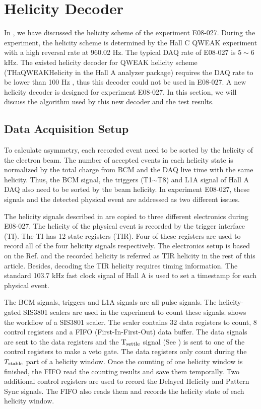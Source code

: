 
\chapter{Helicity Decoder}
\label{A2}

In , we have discussed the helicity scheme of the experiment E08-027. During the experiment, the helicity scheme is determined by the Hall C QWEAK experiment with a high reversal rate at 960.02 Hz. The typical DAQ rate of E08-027 is $5\sim6$ kHz. The existed helicity decoder for QWEAK helicity scheme (THaQWEAKHelicity in the Hall A analyzer package) requires the DAQ rate to be lower than 100 Hz \cite{Hansen2015}, thus this decoder could not be used in E08-027. A new helicity decoder is designed for experiment E08-027. In this section, we will discuss the algorithm used by this new decoder and the test results.

\section{Data Acquisition Setup}
\label{A2S1}

To calculate asymmetry, each recorded event need to be sorted by the helicity of the electron beam. The number of accepted events in each helicity state is normalized by the total charge from BCM and the DAQ live time with the same helicity. Thus, the BCM signal, the triggers (T1$\sim$T8) and L1A signal of Hall A DAQ also need to be sorted by the beam helicity. In experiment E08-027, these signals and the detected physical event are addressed as two different issues.

The helicity signals described in  are copied to three different electronics during E08-027. The helicity of the physical event is recorded by the trigger interface (TI). The TI has 12 state registers (TIR). Four of these registers are used to record all of the four helicity signals respectively. The electronics setup is based on the Ref. \cite{Michaels2010} and the recorded helicity is referred as TIR helicity in the rest of this article. Besides, decoding the TIR helicity requires timing information. The standard 103.7 kHz fast clock signal of Hall A is used to set a timestamp for each physical event.

The BCM signals, triggers and L1A signals are all pulse signals. The helicity-gated SIS3801 scalers are used in the experiment to count these signals.  shows the workflow of a SIS3801 scaler. The scaler contains 32 data registers to count, 8 control registers and a FIFO (First-In-First-Out) data buffer. The data signals are sent to the data registers and the $\mathrm{T}_{\mathrm{settle}}$ signal (See ) is sent to one of the control registers to make a veto gate. The data registers only count during the $T_{\mathrm{stable}}$ part of a helicity window. Once the counting of one helicity window is finished, the FIFO read the counting results and save them temporally. Two additional control registers are used to record the Delayed Helicity and Pattern Sync signals. The FIFO also reads them and records the helicity state of each helicity window.

